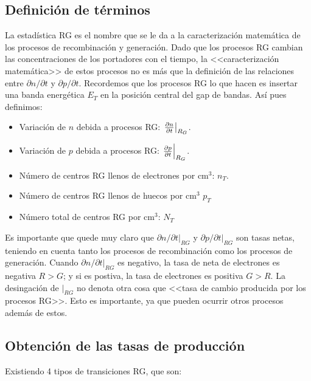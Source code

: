 \subsection{Definición de términos}

La estadística RG es el nombre que se le da a la caracterización matemática de los procesos de recombinación y generación. Dado que los procesos RG cambian las concentraciones de los portadores con el tiempo, la <<caracterización matemática>> de estos procesos no es más que la definición de las relaciones entre $\partial n / \partial t$ y $\partial p / \partial t$. Recordemos que los procesos RG lo que hacen es insertar una banda energética $E_T$ en la posición central del gap de bandas. Así pues definimos: 

\begin{itemize}
	\item Variación de $n$ debida a procesos RG: $\eval{\parciales{n}{t}}_{R_G}$.
	\item Variación de $p$ debida a procesos RG: $\eval{\parciales{p}{t}}_{R_G}$.
	\item Número de centros RG llenos de electrones por $\mathrm{cm}^3$: $n_T$.
	\item Número de centros RG llenos de huecos por $\mathrm{cm}^3$ $p_T$
	\item Número total de centros RG por $\mathrm{cm}^3$: $N_T$
\end{itemize}
Es importante que quede muy claro que $\partial n / \partial t |_{RG}$ y $\partial p / \partial t|_{RG} $ son tasas netas, teniendo en cuenta tanto los procesos de recombinación como los procesos de generación. Cuando $\partial n / \partial t|_{RG}$ es negativo, la tasa de neta de electrones es negativa $R>G$; y si es postiva, la tasa de electrones es positiva $G>R$. La desingación de $|_{RG}$ no denota otra cosa que <<tasa de cambio producida por los procesos RG>>. Esto es importante, ya que pueden ocurrir otros procesos además de estos. 

\subsection{Obtención de las tasas de producción} 

Existiendo 4 tipos de transiciones RG, que son:

